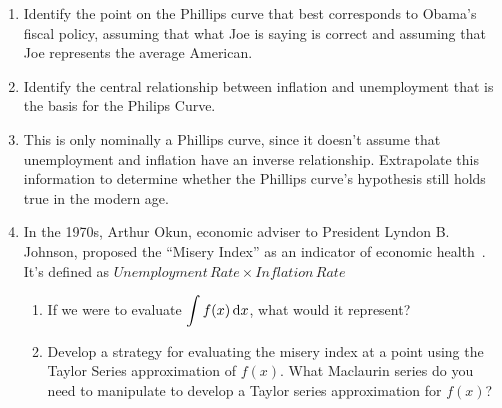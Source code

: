 \begin{enumerate}[itemsep=0.5cm]
            \begin{adjustwidth}{0.3in}{0.3in}
                  \begin{enumerate}[itemsep=0.5cm]

                        \item Identify the point on the Phillips curve that best
                              corresponds to Obama's fiscal policy, assuming that
                              what Joe is saying is correct and assuming that Joe
                              represents the average American.
                        \item Identify the central relationship between inflation
                              and unemployment that is the basis for the Philips Curve.

                        \item This is only nominally a Phillips curve,
                              since it doesn't assume that unemployment
                              and inflation have an inverse
                              relationship. Extrapolate this information
                              to determine whether the Phillips curve's
                              hypothesis still holds true in the modern
                              age.

                              \clearpage

                        \item
                              In the 1970s, Arthur Okun, economic adviser to
                              President Lyndon B. Johnson, proposed the ``Misery
                              Index'' as an indicator of economic
                              health~\cite{inflationdata}. It's defined as
                              $Unemployment\,Rate \times Inflation\,Rate$

                              \begin{enumerate}
                                    \item If we were to evaluate $\displaystyle \int f(x) \,
                                                \differential x$, what would it represent?

                                    \item Develop a strategy for evaluating the misery
                                          index at a point using the Taylor Series
                                          approximation of $f(x)$. What Maclaurin series do
                                          you need to manipulate to develop a Taylor series
                                          approximation for $f(x)$?


\end{enumerate}
\end{enumerate}
\end{adjustwidth}
\end{enumerate}
